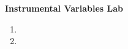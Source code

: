 \documentclass[a4paper,12pt]{article}
\begin{document}
\begin{center}
\textbf{Instrumental Variables Lab}
\end{center}


\begin{enumerate}\itemsep0.5em

\item %
\item %


\end{enumerate}
\end{document}
